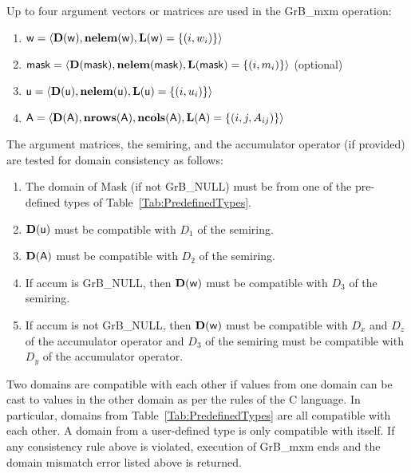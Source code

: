 Up to four argument vectors or matrices are used in the {\sf GrB\_mxm} operation:
\begin{enumerate}
	\item ${\sf w} = \langle \bold{D}({\sf w}),\bold{nelem}({\sf w}),\bold{L}({\sf w}) = \{(i,w_i) \} \rangle$
	\item ${\sf mask} = \langle \bold{D}({\sf mask}),\bold{nelem}({\sf mask}),\bold{L}({\sf mask}) = \{(i,m_i) \} \rangle$ (optional)
	\item ${\sf u} = \langle \bold{D}({\sf u}),\bold{nelem}({\sf u}),\bold{L}({\sf u}) = \{(i,u_i) \} \rangle$
	\item ${\sf A} = \langle \bold{D}({\sf A}),\bold{nrows}({\sf A}), \bold{ncols}({\sf A}),\bold{L}({\sf A}) = \{(i,j,A_{ij}) \} \rangle$
\end{enumerate}

The argument matrices, the semiring, and the accumulator operator (if provided) 
are tested for domain consistency as follows:
\begin{enumerate}
	\item The domain of {\sf Mask} (if not {\sf GrB\_NULL}) must be from one of the pre-defined types of Table~\ref{Tab:PredefinedTypes}.

	\item $\bold{D}({\sf u})$ must be compatible with $D_1$ of the semiring.

	\item $\bold{D}({\sf A})$ must be compatible with $D_2$ of the semiring.

	\item If {\sf accum} is {\sf GrB\_NULL}, then $\bold{D}({\sf w})$ must be compatible with $D_3$ of the semiring.

	\item If {\sf accum} is not {\sf GrB\_NULL}, then $\bold{D}({\sf w})$ must be compatible with $D_x$ and $D_z$ of the 
	accumulator operator and $D_3$ of the semiring must be compatible with $D_y$ of the accumulator operator.
\end{enumerate}
Two domains are compatible with each other if values from one domain can be cast 
to values in the other domain as per the rules of the C language.
In particular, domains from Table~\ref{Tab:PredefinedTypes} are all compatible 
with each other. A domain from a user-defined type is only compatible with itself.
If any consistency rule above is violated, execution of {\sf GrB\_mxm} ends and 
the domain mismatch error listed above is returned.

